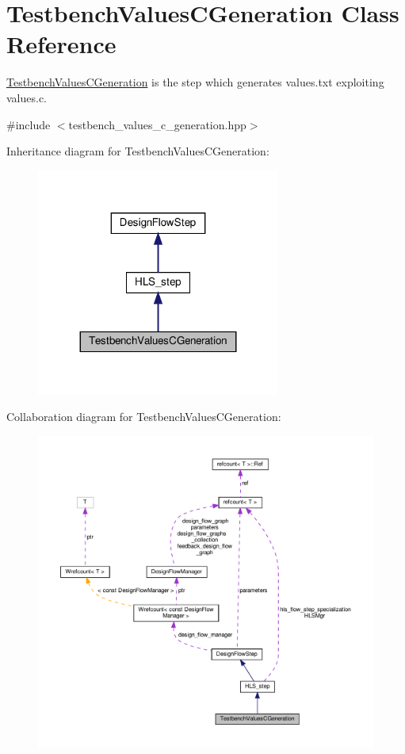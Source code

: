 \hypertarget{classTestbenchValuesCGeneration}{}\section{Testbench\+Values\+C\+Generation Class Reference}
\label{classTestbenchValuesCGeneration}


\hyperlink{classTestbenchValuesCGeneration}{Testbench\+Values\+C\+Generation} is the step which generates values.\+txt exploiting values.\+c.  




{\ttfamily \#include $<$testbench\+\_\+values\+\_\+c\+\_\+generation.\+hpp$>$}



Inheritance diagram for Testbench\+Values\+C\+Generation\+:
\nopagebreak
\begin{figure}[H]
\begin{center}
\leavevmode
\includegraphics[width=227pt]{db/de8/classTestbenchValuesCGeneration__inherit__graph}
\end{center}
\end{figure}


Collaboration diagram for Testbench\+Values\+C\+Generation\+:
\nopagebreak
\begin{figure}[H]
\begin{center}
\leavevmode
\includegraphics[width=350pt]{d1/da3/classTestbenchValuesCGeneration__coll__graph}
\end{center}
\end{figure}
